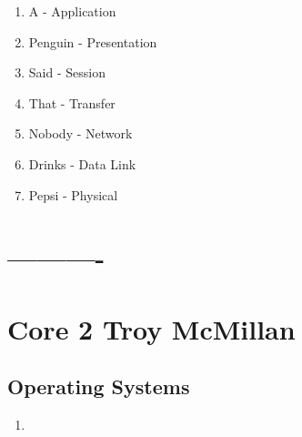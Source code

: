 \documentclass{article}
\begin{document}
\begin{enumerate}
    \item A - Application 
    \item Penguin - Presentation 
    \item Said - Session 
     \item That - Transfer
    \item Nobody - Network 
     \item Drinks - Data Link
    \item Pepsi  - Physical 
\end{enumerate}
\section{----------}
\section{Core 2 Troy McMillan} 
\subsection{Operating Systems} 
\begin{enumerate}
    \item 
\end{enumerate}
\end{document}
